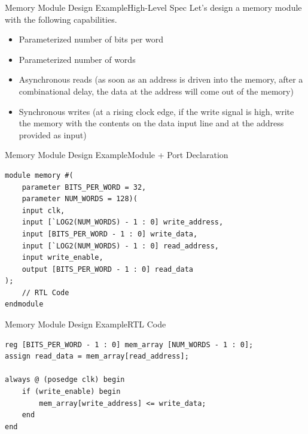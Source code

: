 \documentclass{beamer}
\begin{document}
\begin{frame}{Memory Module Design Example}{High-Level Spec}
	Let's design a memory module with the following capabilities.
	\begin{itemize}
		\item Parameterized number of bits per word
		\item Parameterized number of words
		\item Asynchronous reads (as soon as an address is driven into the memory, after a combinational delay, the data at the address will come out of the memory)
		\item Synchronous writes (at a rising clock edge, if the write signal is high, write the memory with the contents on the data input line and at the address provided as input)
	\end{itemize}
\end{frame}

\begin{frame}[fragile]{Memory Module Design Example}{Module + Port Declaration}
\begin{verbatim}
module memory #(
	parameter BITS_PER_WORD = 32, 
	parameter NUM_WORDS = 128)(
	input clk,
	input [`LOG2(NUM_WORDS) - 1 : 0] write_address,
	input [BITS_PER_WORD - 1 : 0] write_data,
	input [`LOG2(NUM_WORDS) - 1 : 0] read_address,
	input write_enable,
	output [BITS_PER_WORD - 1 : 0] read_data
);
	// RTL Code
endmodule
\end{verbatim}
\end{frame}

\begin{frame}[fragile]{Memory Module Design Example}{RTL Code}
\begin{verbatim}
reg [BITS_PER_WORD - 1 : 0] mem_array [NUM_WORDS - 1 : 0];
assign read_data = mem_array[read_address];

always @ (posedge clk) begin
	if (write_enable) begin
		mem_array[write_address] <= write_data;
	end
end
\end{verbatim}
\end{frame}
\end{document}
